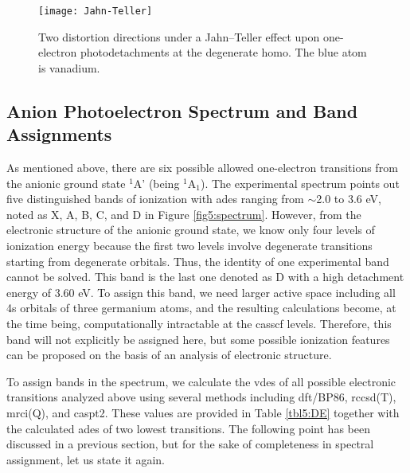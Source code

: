 \begin{refsection}
\begin{figure}[htb!]
    \centering
    \texttt{[image: Jahn-Teller]}
    \caption{Two distortion directions under a Jahn–Teller effect upon one-electron photodetachments at the degenerate \acrshort{homo}. The blue atom is vanadium.}
    \label{fig5:JT}
\end{figure} 



\subsection{Anion Photoelectron Spectrum and Band Assignments}


As mentioned above, there are six possible allowed one-electron transitions from the anionic ground state $^1$A' (being $^1$A$_1$). The experimental spectrum points out five distinguished bands of ionization with \acrshort{ade}s ranging from $\sim$2.0 to 3.6 eV, noted as X, A, B, C, and D in Figure \ref{fig5:spectrum}. However, from the electronic structure of the anionic ground state, we know only four levels of ionization energy because the first two levels involve degenerate transitions starting from degenerate orbitals. Thus, the identity of one experimental band cannot be solved. This band is the last one denoted as D with a high detachment energy of 3.60 eV. To assign this band, we need larger active space including all 4s orbitals of three germanium atoms, and the resulting calculations become, at the time being, computationally intractable at the \acrshort{casscf} levels. Therefore, this band will not explicitly be assigned here, but some possible ionization features can be proposed on the basis of an analysis of electronic structure.





To assign bands in the spectrum, we calculate the \acrshort{vde}s of all possible electronic transitions analyzed above using several methods including \acrshort{dft}/BP86, \acrshort{rccsd}(T), \acrshort{mrci}(Q), and \acrshort{caspt2}. These values are provided in Table \ref{tbl5:DE} together with the calculated \acrshort{ade}s of two lowest transitions. The following point has been discussed in a previous section, but for the sake of completeness in spectral assignment, let us state it again.




\end{refsection}
